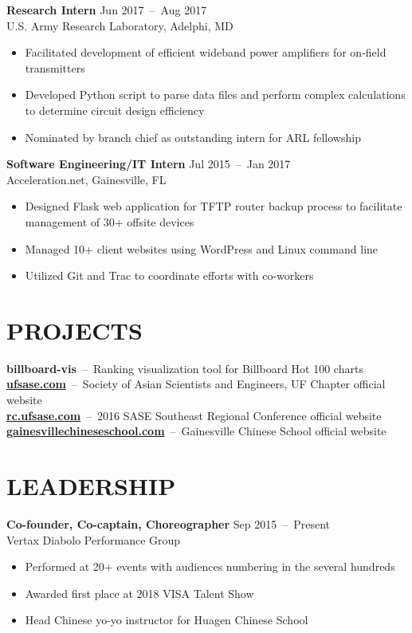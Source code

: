 \documentclass[line,resmargin]{res}
\begin{document}
\begin{resume}
    \textbf{Research Intern}    \hfill Jun 2017~--~Aug 2017 \\
    U.S. Army Research Laboratory, Adelphi, MD
    \begin{itemize}  \itemsep -2pt
        \item Facilitated development of efficient wideband power amplifiers for on-field transmitters
        \item Developed Python script to parse data files and perform complex calculations to determine circuit design efficiency
        \item Nominated by branch chief as outstanding intern for ARL fellowship
    \end{itemize}

    \textbf{Software Engineering/IT Intern}    \hfill Jul 2015~--~Jan 2017 \\
    Acceleration.net, Gainesville, FL
    \begin{itemize}  \itemsep -2pt
        \item Designed Flask web application for TFTP router backup process to facilitate management of 30+ offsite devices
        \item Managed 10+ client websites using WordPress and Linux command line
        \item Utilized Git and Trac to coordinate efforts with co-workers
    \end{itemize}

\section{PROJECTS}
    \textbf{billboard-vis}~--~Ranking visualization tool for Billboard Hot 100 charts \\
    \textbf{\href{http://ufsase.com}{ufsase.com}}~--~Society of Asian Scientists and Engineers, UF Chapter official website \\
    \textbf{\href{http://rc.ufsase.com}{rc.ufsase.com}}~--~2016 SASE Southeast Regional Conference official website \\
    \textbf{\href{https://gainesvillechineseschool.com}{gainesvillechineseschool.com}}~--~Gainesville Chinese School official website

\section{LEADERSHIP}
    \textbf{Co-founder, Co-captain, Choreographer}    \hfill Sep 2015~--~Present \\
    Vertax Diabolo Performance Group
    \begin{itemize}  \itemsep -2pt
        \item Performed at 20+ events with audiences numbering in the several hundreds
        \item Awarded first place at 2018 VISA Talent Show
        \item Head Chinese yo-yo instructor for Huagen Chinese School
    \end{itemize}


\end{resume}
\end{document}

